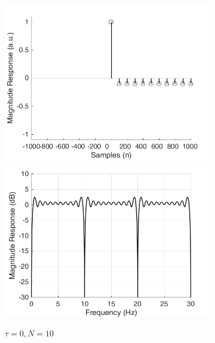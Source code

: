 \documentclass[a4paper]{article}
\begin{document}
\begin{figure}[hbtp]
    \begin{subfigure}{.245\textwidth}
        \includegraphics[width=\textwidth]{img/tau/kernel_exp_0.png}\\
        \includegraphics[width=\textwidth]{img/tau/mag_exp_0.png}
        \caption{$\tau=0, N=10$}\label{fig:ExpTau0}
    \end{subfigure}
    \begin{subfigure}{.245\textwidth}

\end{subfigure}
\end{figure}
\end{document}

